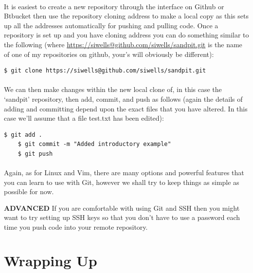 \documentclass[12pt, a4paper, twoside]{book}
\begin{document}
\paragraph{} It is easiest to create a new repository through the interface on Github or Btbucket then use the repository cloning address to make a local copy as this sets up all the addresses automatically for pushing and pulling code. Once a repository is set up and you have cloning address you can do something similar to the following (where \url{https://siwells@github.com/siwells/sandpit.git} is the name of one of my repositories on github, your's will obviously be different):

\begin{lstlisting}[style=DOS]
    $ git clone https://siwells@github.com/siwells/sandpit.git
\end{lstlisting}

\paragraph{} We can then make changes within the new local clone of, in this case the `sandpit' repository, then add, commit, and push as follows (again the details of adding and committing depend upon the exact files that you have altered. In this case we'll assume that a file test.txt has been edited):

\begin{lstlisting}[style=DOS]
    $ git add .
    $ git commit -m "Added introductory example"
    $ git push
\end{lstlisting}

\paragraph{} Again, as for Linux and Vim, there are many options and powerful features that you can learn to use with Git, however we shall try to keep things as simple as possible for now.

\begin{framed}
\textbf{ADVANCED} If you are comfortable with using Git and SSH then you might want to try setting up SSH keys so that you don't have to use a password each time you push code into your remote repository.
\end{framed}

\section{Wrapping Up}
\label{chapter_01_wrap-up}
\end{document}
